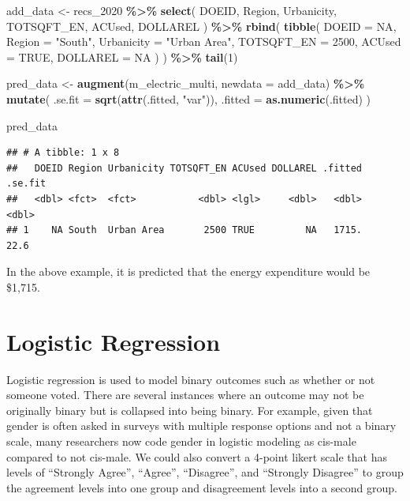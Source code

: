 \documentclass[
]{krantz}
\makeatletter
\newenvironment{Shaded}{\begin{snugshade}}{\end{snugshade}}
\newcommand{\AttributeTok}[1]{\textcolor[rgb]{0.27,0.27,0.27}{#1}}
\newcommand{\ConstantTok}[1]{\textcolor[rgb]{0.37,0.37,0.37}{#1}}
\newcommand{\DecValTok}[1]{\textcolor[rgb]{0.06,0.06,0.06}{#1}}
\newcommand{\FunctionTok}[1]{\textcolor[rgb]{0.27,0.27,0.27}{\textbf{#1}}}
\newcommand{\NormalTok}[1]{#1}
\newcommand{\OtherTok}[1]{\textcolor[rgb]{0.37,0.37,0.37}{#1}}
\newcommand{\SpecialCharTok}[1]{\textcolor[rgb]{0.43,0.43,0.43}{\textbf{#1}}}
\newcommand{\StringTok}[1]{\textcolor[rgb]{0.5,0.5,0.5}{#1}}
\newenvironment{kframe}{%
\medskip{}
\setlength{\fboxsep}{.8em}
 \def\at@end@of@kframe{}%
 \ifinner\ifhmode%
  \def\at@end@of@kframe{\end{minipage}}%
  \begin{minipage}{\columnwidth}%
 \fi\fi%
 \def\FrameCommand##1{\hskip\@totalleftmargin \hskip-\fboxsep
 \colorbox{shadecolor}{##1}\hskip-\fboxsep
     \hskip-\linewidth \hskip-\@totalleftmargin \hskip\columnwidth}%
 \MakeFramed {\advance\hsize-\width
   \@totalleftmargin\z@ \linewidth\hsize
   \@setminipage}}%
 {\par\unskip\endMakeFramed%
 \at@end@of@kframe}
\renewenvironment{Shaded}{\begin{kframe}}{\end{kframe}}
\makeatother
\begin{document}
\begin{Shaded}
\begin{Highlighting}[]
\NormalTok{add\_data }\OtherTok{\textless{}{-}}\NormalTok{ recs\_2020 }\SpecialCharTok{\%\textgreater{}\%}
  \FunctionTok{select}\NormalTok{(}
\NormalTok{    DOEID, Region, Urbanicity,}
\NormalTok{    TOTSQFT\_EN, ACUsed,}
\NormalTok{    DOLLAREL}
\NormalTok{  ) }\SpecialCharTok{\%\textgreater{}\%}
  \FunctionTok{rbind}\NormalTok{(}
    \FunctionTok{tibble}\NormalTok{(}
      \AttributeTok{DOEID =} \ConstantTok{NA}\NormalTok{,}
      \AttributeTok{Region =} \StringTok{"South"}\NormalTok{,}
      \AttributeTok{Urbanicity =} \StringTok{"Urban Area"}\NormalTok{,}
      \AttributeTok{TOTSQFT\_EN =} \DecValTok{2500}\NormalTok{,}
      \AttributeTok{ACUsed =} \ConstantTok{TRUE}\NormalTok{,}
      \AttributeTok{DOLLAREL =} \ConstantTok{NA}
\NormalTok{    )}
\NormalTok{  ) }\SpecialCharTok{\%\textgreater{}\%}
  \FunctionTok{tail}\NormalTok{(}\DecValTok{1}\NormalTok{)}

\NormalTok{pred\_data }\OtherTok{\textless{}{-}} \FunctionTok{augment}\NormalTok{(m\_electric\_multi, }\AttributeTok{newdata =}\NormalTok{ add\_data) }\SpecialCharTok{\%\textgreater{}\%}
  \FunctionTok{mutate}\NormalTok{(}
    \AttributeTok{.se.fit =} \FunctionTok{sqrt}\NormalTok{(}\FunctionTok{attr}\NormalTok{(.fitted, }\StringTok{"var"}\NormalTok{)),}
    \AttributeTok{.fitted =} \FunctionTok{as.numeric}\NormalTok{(.fitted)}
\NormalTok{  )}

\NormalTok{pred\_data}
\end{Highlighting}
\end{Shaded}

\begin{verbatim}
## # A tibble: 1 x 8
##   DOEID Region Urbanicity TOTSQFT_EN ACUsed DOLLAREL .fitted .se.fit
##   <dbl> <fct>  <fct>           <dbl> <lgl>     <dbl>   <dbl>   <dbl>
## 1    NA South  Urban Area       2500 TRUE         NA   1715.    22.6
\end{verbatim}

In the above example, it is predicted that the energy expenditure would be \$1,715.

\hypertarget{logistic-regression}{%
\section{Logistic Regression}\label{logistic-regression}}

Logistic regression is used to model binary outcomes such as whether or not someone voted. There are several instances where an outcome may not be originally binary but is collapsed into being binary. For example, given that gender is often asked in surveys with multiple response options and not a binary scale, many researchers now code gender in logistic modeling as cis-male compared to not cis-male. We could also convert a 4-point likert scale that has levels of ``Strongly Agree'', ``Agree'', ``Disagree'', and ``Strongly Disagree'' to group the agreement levels into one group and disagreement levels into a second group.
\end{document}
